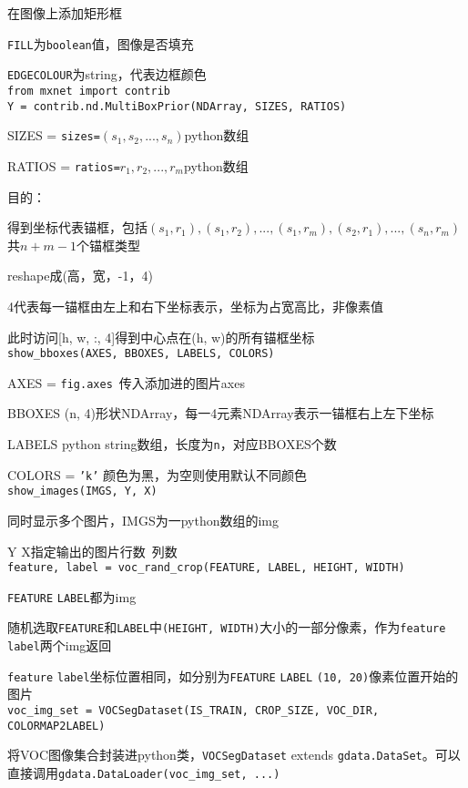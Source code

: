 \documentclass[UTF8]{ctexart}
\begin{document}
  在图像上添加矩形框

  \texttt{FILL}为\texttt{boolean}值，图像是否填充

  \texttt{EDGECOLOUR}为string，代表边框颜色\\
\texttt{from mxnet import contrib}\\
\texttt{Y = contrib.nd.MultiBoxPrior(NDArray, SIZES, RATIOS)}

  SIZES = \texttt{sizes=}$(s_1, s_2,...,s_n)$python数组

  RATIOS = \texttt{ratios=}$r_1, r_2, ...,r_m$python数组

  目的：
  
  \quad 得到坐标代表锚框，包括$(s_1, r_1), (s_1, r_2), ..., (s_1, r_m), (s_2, r_1), ..., (s_n, r_m)$共$n+m-1$个锚框类型

  \quad reshape成(高，宽，-1，4)

  \quad 4代表每一锚框由左上和右下坐标表示，坐标为占宽高比，非像素值

  \quad \quad 此时访问[h, w, :, 4]得到中心点在(h, w)的所有锚框坐标\\
\texttt{show\_bboxes(AXES, BBOXES, LABELS, COLORS)}

  AXES = \texttt{fig.axes}\ 传入添加进的图片axes

  BBOXES (n, 4)形状NDArray，每一4元素NDArray表示一锚框右上左下坐标

  LABELS python string数组，长度为\texttt{n}，对应BBOXES个数

  COLORS = \texttt{'k'} 颜色为黑，为空则使用默认不同颜色\\
\texttt{show\_images(IMGS, Y, X)}

  同时显示多个图片，IMGS为一python数组的img

  Y X指定输出的图片行数\ 列数\\
\texttt{feature, label = voc\_rand\_crop(FEATURE, LABEL, HEIGHT, WIDTH)}

  \texttt{FEATURE} \texttt{LABEL}都为img

  随机选取\texttt{FEATURE}和\texttt{LABEL}中\texttt{(HEIGHT, WIDTH)}大小的一部分像素，作为\texttt{feature} \texttt{label}两个img返回
  
  \texttt{feature} \texttt{label}坐标位置相同，如分别为\texttt{FEATURE} \texttt{LABEL} \texttt{(10, 20)}像素位置开始的图片\\
\texttt{voc\_img\_set = VOCSegDataset(IS\_TRAIN, CROP\_SIZE, VOC\_DIR, COLORMAP2LABEL)}

  将VOC图像集合封装进python类，\texttt{VOCSegDataset} extends \texttt{gdata.DataSet}。可以直接调用\texttt{gdata.DataLoader(voc\_img\_set, ...)}
\end{document}
